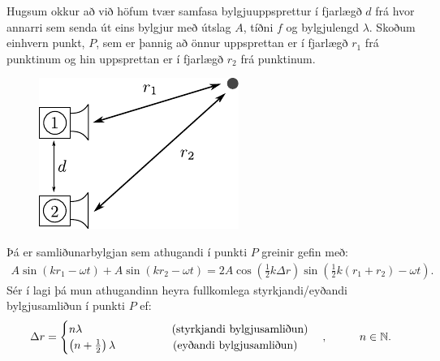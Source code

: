 \ifdefined \wholebook \else\documentclass[oneside]{book}\usepackage{EdlBook}\graphicspath{{figures/}}
\begin{document}
\begin{tcolorbox}
\begin{theorem}
Hugsum okkur að við höfum tvær samfasa bylgjuuppsprettur í fjarlægð $d$ frá hvor annarri sem senda út eins bylgjur með útslag $A$, tíðni $f$ og bylgjulengd $\lambda$. Skoðum einhvern punkt, $P$, sem er þannig að önnur uppsprettan er í fjarlægð $r_1$ frá punktinum og hin uppsprettan er í fjarlægð $r_2$ frá punktinum.
\begin{figure}[H]
    \centering
    \vspace{-0.5cm}
    \includegraphics{figures/hatalari-dist.pdf}
\end{figure}
Þá er samliðunarbylgjan sem athugandi í punkti $P$ greinir gefin með:
\begin{align*} 
A\sin(kr_1-\omega t) + A\sin(kr_2 - \omega t) = 2A\cos(\frac{1}{2}k\Delta r)\sin(\frac{1}{2}k(r_1+r_2)-\omega t).
\end{align*}
Sér í lagi þá mun athugandinn heyra fullkomlega styrkjandi/eyðandi bylgjusamliðun í punkti $P$ ef:
\begin{align*}
    \Delta r = \begin{cases}
    n \lambda \hspace{2.8cm} \text{(styrkjandi bylgjusamliðun)} \\
    \left(n+\frac{1}{2}\right)\lambda \hspace{1.8cm} \text{(eyðandi bylgjusamliðun)}
    \end{cases},\hspace{1cm} n \in \mathbb{N}.
\end{align*}
\end{theorem}
\end{tcolorbox}
\end{document}
